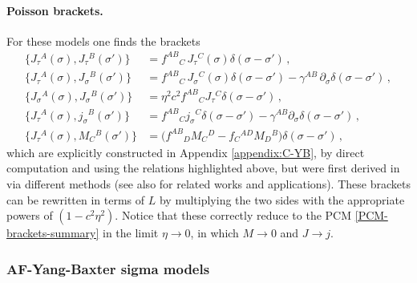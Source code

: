 \documentclass[12pt]{article}
\numberwithin{equation}{section}
\begin{document}
\paragraph{Poisson brackets.}
For these models one finds the brackets
\begin{equation}\label{YB-brackets-summary}
\begin{aligned}
\{ J_{\tau}{}^{A}(\sigma),J_{\tau}{}^{B}(\sigma') \} &= f^{AB}{}_{C} \, J_{\tau}{}^{C}(\sigma)\delta(\sigma-\sigma') \, ,
\\
\{ J_{\tau}{}^{A}(\sigma),J_{\sigma}{}^{B}(\sigma') \} &= f^{AB}{}_{C} \, J_{\sigma}{}^{C}(\sigma)\delta(\sigma-\sigma')-\gamma^{AB} \, \partial_{\sigma}\delta(\sigma-\sigma') \, ,
\\
\{ J_{\sigma}{}^{A}(\sigma),J_{\sigma}{}^{B}(\sigma') \} &= \eta^2 c^2 f^{AB}{}_{C}J_{\tau}{}^{C}\delta(\sigma-\sigma') \, ,
\\
\{ J_{\tau}{}^{A}(\sigma),j_{\sigma}{}^{B}(\sigma') \} &= f^{AB}{}_{C}j_{\sigma}{}^{C}\delta(\sigma-\sigma')-\gamma^{AB}\partial_{\sigma}\delta(\sigma-\sigma') \, ,
\\
\{ J_{\tau}{}^{A}(\sigma),M_{C}{}^{B}(\sigma') \} &= \bigl(f^{AB}{}_{D}M_{C}{}^{D}-f_{C}{}^{AD}M_{D}{}^{B}\bigr)\delta(\sigma-\sigma') \, ,
\end{aligned}
\end{equation}
which are explicitly constructed in Appendix \ref{appendix:C-YB}, by direct computation and using the relations highlighted above, but were first derived in \cite{Delduc:2013fga} via different methods (see also \cite{Delduc:2013qra,Delduc:2014kha} for related works and applications). These brackets can be rewritten in terms of $L$ by multiplying the two sides with the appropriate powers of $(1-c^2\eta^2)$. Notice that these correctly reduce to the PCM \eqref{PCM-brackets-summary} in the limit $\eta \rightarrow 0$, in which $M\rightarrow 0$ and $J\rightarrow j $. 


\subsubsection{AF-Yang-Baxter sigma models}\label{subsubsec:AFYB}
\end{document}
